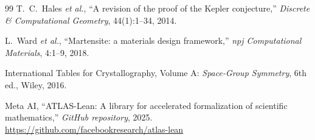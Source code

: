\documentclass[11pt,a4paper]{article}
\theoremstyle{definition}
\theoremstyle{plain}
\begin{document}
\begin{thebibliography}{99}
T.~C.~Hales \emph{et al.}, ``A revision of the proof of the Kepler conjecture,'' \emph{Discrete \& Computational Geometry}, 44(1):1--34, 2014.

L.~Ward \emph{et al.}, ``Martensite: a materials design framework,'' \emph{npj Computational Materials}, 4:1--9, 2018.

International Tables for Crystallography, Volume A: \emph{Space-Group Symmetry}, 6th ed., Wiley, 2016.

Meta AI, ``ATLAS-Lean: A library for accelerated formalization of scientific mathematics,'' \emph{GitHub repository}, 2025. \url{https://github.com/facebookresearch/atlas-lean}

\end{thebibliography}
\end{document}
